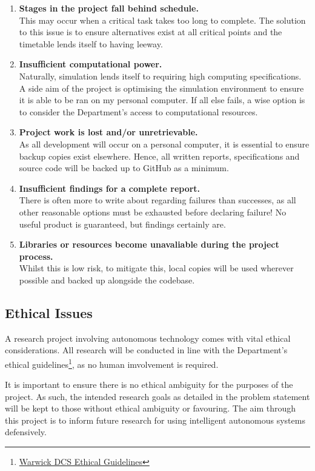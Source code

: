 \documentclass{article}
\begin{document}
\begin{enumerate}
    \item \textbf{Stages in the project fall behind schedule.} \\ This may occur when a critical task takes too long to complete.
    The solution to this issue is to ensure alternatives exist at all critical points and the timetable lends itself to having leeway.
    \item \textbf{Insufficient computational power.} \\ Naturally, simulation lends itself to requiring high computing specifications.
    A side aim of the project is optimising the simulation environment to ensure it is able to be ran on my personal computer. If all
    else fails, a wise option is to consider the Department's access to computational resources.
    \item \textbf{Project work is lost and/or unretrievable.} \\ As all development will occur on a personal computer, it is essential
    to ensure backup copies exist elsewhere. Hence, all written reports, specifications and source code will be backed up to GitHub as a minimum.
    \item \textbf{Insufficient findings for a complete report.} \\ There is often more to write about regarding failures than successes, as all
    other reasonable options must be exhausted before declaring failure! No useful product is guaranteed, but findings certainly are.
    \item \textbf{Libraries or resources become unavaliable during the project process.} \\ Whilst this is low risk, to mitigate this, local copies
    will be used wherever possible and backed up alongside the codebase.
\end{enumerate}


\subsection{Ethical Issues}
A research project involving autonomous technology comes with vital ethical considerations. All research
will be conducted in line with the Department's ethical guidelines\footnote{\href{https://warwick.ac.uk/fac/sci/dcs/teaching/ethics}{Warwick DCS Ethical Guidelines}}, as no human imvolvement is required.

It is important to ensure there is no ethical ambiguity for the purposes of the project. As such, the intended research goals as detailed
in the problem statement will be kept to those without ethical ambiguity or favouring. The aim through this project is to inform future research
for using intelligent autonomous systems defensively.

\newpage



\end{document}
